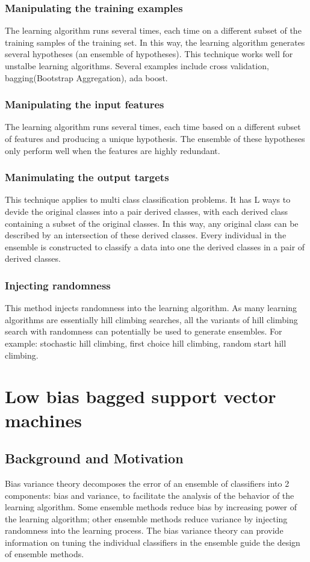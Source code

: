 \documentclass[12pt]{article}
\begin{document}
\subsubsection{Manipulating the training examples}
The learning algorithm runs several times, each time on a different subset of the training samples of the training set. In this way, the learning algorithm generates several hypotheses (an ensemble of hypotheses). This technique works well for unstalbe learning algorithms. Several examples include cross validation, bagging(Bootstrap Aggregation), ada boost.
\subsubsection{Manipulating the input features}
The learning algorithm runs several times, each time based on a different subset of features and producing a unique hypothesis. The ensemble of these hypotheses only perform well when the features are highly redundant.
\subsubsection{Manimulating the output targets}
This technique applies to multi class classification problems. It has L ways to devide the original classes into a pair derived classes, with each derived class containing a subset of the original classes. In this way, any original class can be described by an intersection of these derived classes. Every individual in the ensemble is constructed to classify a data into one the derived classes in a pair of derived classes.
\subsubsection{Injecting randomness}
This method injects randomness into the learning algorithm. As many learning algorithms are essentially hill climbing searches, all the variants of hill climbing search with randomness can potentially be used to generate ensembles. For example: stochastic hill climbing, first choice hill climbing, random start hill climbing.

\section{Low bias bagged support vector machines}
      
\subsection{Background and Motivation}
Bias variance theory decomposes the error of an ensemble of classifiers into 2 components: bias and variance, to facilitate the analysis of the behavior of the learning algorithm. Some ensemble methods reduce bias by increasing power of the learning algorithm; other ensemble methods reduce variance by injecting randomness into the learning process. The bias variance theory can provide information on tuning the individual classifiers in the ensemble guide the design of ensemble methods.
\end{document}
